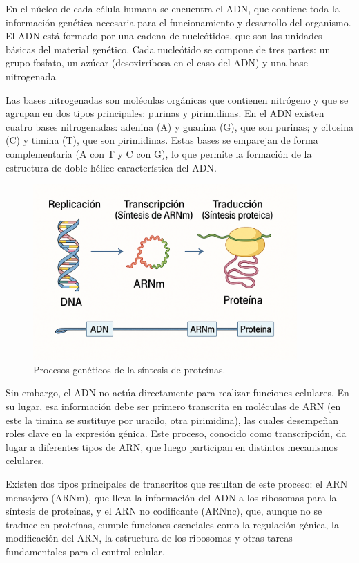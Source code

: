 \documentclass[11pt,spanish,listoffigures,listoftables]{tfgetsinf}
\begin{document}
En el núcleo de cada célula humana se encuentra el ADN, que contiene toda la información genética necesaria para el funcionamiento y desarrollo del organismo. El ADN está formado por una cadena de nucleótidos, que son las unidades básicas del material genético. Cada nucleótido se compone de tres partes: un grupo fosfato, un azúcar (desoxirribosa en el caso del ADN) y una base nitrogenada.

Las bases nitrogenadas son moléculas orgánicas que contienen nitrógeno y que se agrupan en dos tipos principales: purinas y pirimidinas. En el ADN existen cuatro bases nitrogenadas: adenina (A) y guanina (G), que son purinas; y citosina (C) y timina (T), que son pirimidinas. Estas bases se emparejan de forma complementaria (A con T y C con G), lo que permite la formación de la estructura de doble hélice característica del ADN\cite{GEN}.


\begin{figure}[H]
   \centering
   \includegraphics[width=0.9\textwidth]{ADN.png}
   \caption{Procesos genéticos de la síntesis de proteínas.}
   \label{fig:etiqueta_opcional1}
\end{figure}

Sin embargo, el ADN no actúa directamente para realizar funciones celulares. En su lugar, esa información debe ser primero transcrita en moléculas de ARN (en este la timina se sustituye por uracilo, otra pirimidina), las cuales desempeñan roles clave en la expresión génica. Este proceso, conocido como transcripción, da lugar a diferentes tipos de ARN, que luego participan en distintos mecanismos celulares.

Existen dos tipos principales de transcritos que resultan de este proceso: el ARN mensajero (ARNm), que lleva la información del ADN a los ribosomas para la síntesis de proteínas, y el ARN no codificante (ARNnc), que, aunque no se traduce en proteínas, cumple funciones esenciales como la regulación génica, la modificación del ARN, la estructura de los ribosomas y otras tareas fundamentales para el control celular\cite[p.~254-300]{WAT}. 
\end{document}
